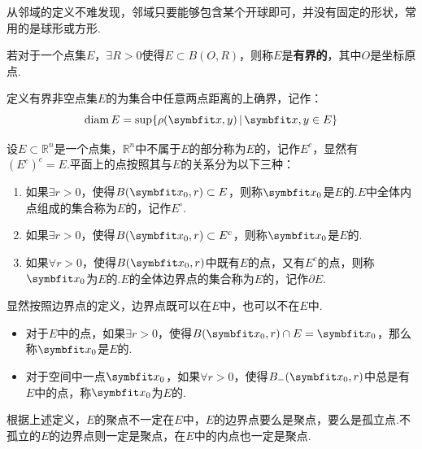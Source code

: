 从邻域的定义不难发现，邻域只要能够包含某个开球即可，并没有固定的形状，常用的是球形或方形.

\begin{definition}
    若对于一个点集$E$，$\exists R>0$使得$E \subset B(O,R)$，则称$E$是\textbf{有界的}，其中$O$是坐标原点.

    定义有界非空点集$E$的为集合中任意两点距离的上确界，记作：
    \[\mathrm{diam}\, E = \sup\{\rho({\vb{x,y}})\,|\,\vb{x,y}\in E\}\]
\end{definition}

\begin{definition}
    设$E \subset \mathbb{R}^n$是一个点集，$\mathbb{R}^n$中不属于$E$的部分称为$E$的，记作$E^c$，显然有$(E^c)^c = E$.平面上的点按照其与$E$的关系分为以下三种：
    \begin{enumerate}[circ]
        \item 如果$\exists r>0$，使得$B(\vb{x}_0,r) \subset E$，则称$\vb{x}_0$是$E$的.$E$中全体内点组成的集合称为$E$的，记作$E^\circ$.
        \item 如果$\exists r>0$，使得$B(\vb{x}_0,r) \subset E^c$，则称$\vb{x}_0$是$E$的.
        \item 如果$\forall r>0$，使得$B(\vb{x}_0,r)$中既有$E$的点，又有$E^c$的点，则称$\vb{x}_0$为$E$的.$E$的全体边界点的集合称为$E$的，记作$\partial E$.
    \end{enumerate}
\end{definition}

显然按照边界点的定义，边界点既可以在$E$中，也可以不在$E$中.

\begin{definition}
    \begin{itemize}
        \item 对于$E$中的点，如果$\exists r>0$，使得$B(\vb{x}_0,r) \cap E = \vb{x}_0$，那么称$\vb{x}_0$是$E$的.
        \item 对于空间中一点$\vb{x}_0$，如果$\forall r > 0$，使得$B_-(\vb{x}_0,r)$中总是有$E$中的点，称$\vb{x}_0$为$E$的.
    \end{itemize}
\end{definition}

根据上述定义，$E$的聚点不一定在$E$中，$E$的边界点要么是聚点，要么是孤立点.不孤立的$E$的边界点则一定是聚点，在$E$中的内点也一定是聚点.

